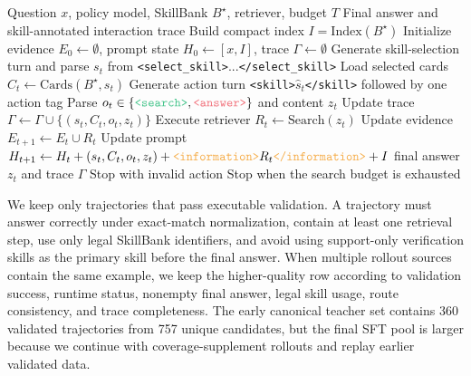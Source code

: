 \documentclass{article}
\newcommand{\tagopen}[2]{\texttt{\textcolor{#1}{<#2>}}}
\newcommand{\tagclose}[2]{\texttt{\textcolor{#1}{</#2>}}}
\begin{document}
\begin{algorithm}[H]
  \caption{Two-phase SkillBank interface in SearchSkill}
  \label{alg:searchskill-rollout}
  \begin{algorithmic}[1]
    \Require Question \(x\), policy model, SkillBank \(B^\star\), retriever, budget \(T\)
    \Ensure Final answer and skill-annotated interaction trace
    \State Build compact index \(I=\mathrm{Index}(B^\star)\)
    \State Initialize evidence \(E_0\leftarrow\emptyset\), prompt state \(H_0\leftarrow[x,I]\), trace \(\Gamma\leftarrow\emptyset\)
      \State Generate skill-selection turn and parse \(s_t\) from \tagopen{selecttagcolor}{select\_skill}...\tagclose{selecttagcolor}{select\_skill}
      \State Load selected cards \(C_t\leftarrow\mathrm{Cards}(B^\star,s_t)\)
      \State Generate action turn \tagopen{skilltagcolor}{skill}\(\hat{s}_t\)\tagclose{skilltagcolor}{skill} followed by one action tag
      \State Parse \(o_t\in\{\tagopen{searchtagcolor}{search},\tagopen{answertagcolor}{answer}\}\) and content \(z_t\)
      \State Update trace \(\Gamma\leftarrow\Gamma\cup\{(s_t,C_t,o_t,z_t)\}\)
        \State Execute retriever \(R_t\leftarrow\mathrm{Search}(z_t)\)
        \State Update evidence \(E_{t+1}\leftarrow E_t\cup R_t\)
        \State Update prompt \(H_{t+1}\leftarrow H_t+(s_t,C_t,o_t,z_t)+\tagopen{infotagcolor}{information}R_t\tagclose{infotagcolor}{information}+I\)
        \State \Return final answer \(z_t\) and trace \(\Gamma\)
      \Else
        \State Stop with invalid action
      \EndIf
    \EndFor
    \State Stop when the search budget is exhausted
  \end{algorithmic}
\end{algorithm}

We keep only trajectories that pass executable validation. A trajectory must answer correctly under exact-match normalization, contain at least one retrieval step, use only legal SkillBank identifiers, and avoid using support-only verification skills as the primary skill before the final answer. When multiple rollout sources contain the same example, we keep the higher-quality row according to validation success, runtime status, nonempty final answer, legal skill usage, route consistency, and trace completeness. The early canonical teacher set contains 360 validated trajectories from 757 unique candidates, but the final SFT pool is larger because we continue with coverage-supplement rollouts and replay earlier validated data.
\end{document}
